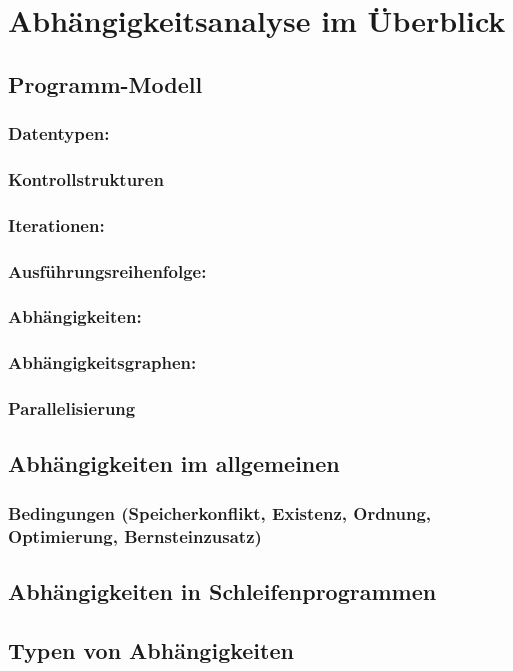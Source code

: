 
\section{Abhängigkeitsanalyse im Überblick}
\subsection{Programm-Modell}
\subsubsection{Datentypen:}
\subsubsection{Kontrollstrukturen}
\subsubsection{Iterationen:}
\subsubsection{Ausführungsreihenfolge:}
\subsubsection{Abhängigkeiten:}
\subsubsection{Abhängigkeitsgraphen:}
\subsubsection{Parallelisierung}
\subsection{Abhängigkeiten im allgemeinen}
\subsubsection{Bedingungen (Speicherkonflikt, Existenz, Ordnung, Optimierung, Bernsteinzusatz)}
\subsection{Abhängigkeiten in Schleifenprogrammen}
\subsection{Typen von Abhängigkeiten}